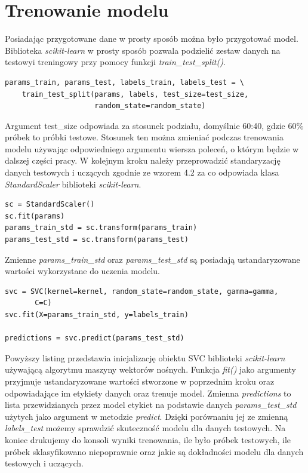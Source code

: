 \documentclass[printmode, eng, openany]{mgr}
\newcommand\tab[1][1cm]{\hspace*{#1}}
\begin{document}
\section{Trenowanie modelu}
\tab Posiadając przygotowane dane w prosty sposób można było przygotować model. Biblioteka \textit{scikit-learn} w prosty sposób pozwala podzielić zestaw danych na testowy\linebreak i treningowy przy pomocy funkcji \textit{train\_test\_split()}.
\begin{lstlisting}
params_train, params_test, labels_train, labels_test = \
    train_test_split(params, labels, test_size=test_size,
                     random_state=random_state)
\end{lstlisting}
\tab Argument test\_size odpowiada za stosunek podziału, domyślnie 60:40, gdzie 60\% próbek to próbki testowe. Stosunek ten można zmieniać podczas trenowania modelu używając odpowiedniego argumentu wiersza poleceń, o którym będzie w dalszej części pracy. W kolejnym kroku należy przeprowadzić standaryzację danych testowych i uczących zgodnie ze wzorem 4.2 za co odpowiada klasa \textit{StandardScaler} biblioteki \textit{scikit-learn}.
\begin{lstlisting}
sc = StandardScaler()
sc.fit(params)
params_train_std = sc.transform(params_train)
params_test_std = sc.transform(params_test)
\end{lstlisting}
\tab Zmienne \textit{params\_train\_std} oraz \textit{params\_test\_std} są posiadają ustandaryzowane wartości wykorzystane do uczenia modelu.

\begin{lstlisting}
svc = SVC(kernel=kernel, random_state=random_state, gamma=gamma,
  	   C=C)
svc.fit(X=params_train_std, y=labels_train)
    
predictions = svc.predict(params_test_std)
\end{lstlisting}
\tab Powyższy listing przedstawia inicjalizację obiektu SVC biblioteki \textit{scikit-learn} używającą algorytmu maszyny wektorów nośnych. Funkcja \textit{fit()} jako argumenty przyjmuje ustandaryzowane wartości stworzone w poprzednim kroku oraz odpowiadające im etykiety danych oraz trenuje model. Zmienna \textit{predictions} to lista przewidzianych przez model etykiet na podstawie danych \textit{params\_test\_std} użytych jako argument w metodzie \textit{predict}. Dzięki porównaniu jej ze zmienną \textit{labels\_test} możemy sprawdzić skuteczność modelu dla danych testowych. Na koniec drukujemy do konsoli wyniki trenowania, ile było próbek testowych, ile próbek sklasyfikowano niepoprawnie oraz jakie są dokładności modelu dla danych testowych i uczących.
\end{document}
